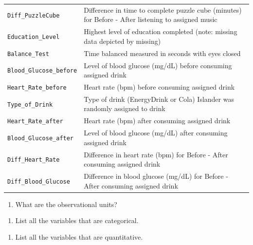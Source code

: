 \documentclass[
]{report}
\providecommand{\tightlist}{%
  \setlength{\itemsep}{0pt}\setlength{\parskip}{0pt}}
\begin{document}
\begin{longtable}[]{@{}
  >{\raggedright\arraybackslash}p{}
  >{\raggedright\arraybackslash}p{}@{}}
\texttt{Diff\_PuzzleCube} & Difference in time to complete puzzle cube (minutes) for Before - After listening to assigned music \\
\texttt{Education\_Level} & Highest level of education completed (note: missing data depicted by missing) \\
\texttt{Balance\_Test} & Time balanced measured in seconds with eyes closed \\
\texttt{Blood\_Glucose\_before} & Level of blood glucose (mg/dL) before consuming assigned drink \\
\texttt{Heart\_Rate\_before} & Heart rate (bpm) before consuming assigned drink \\
\texttt{Type\_of\_Drink} & Type of drink (EnergyDrink or Cola) Islander was randomly assigned to drink \\
\texttt{Heart\_Rate\_after} & Heart rate (bpm) after consuming assigned drink \\
\texttt{Blood\_Glucose\_after} & Level of blood glucose (mg/dL) after consuming assigned drink \\
\texttt{Diff\_Heart\_Rate} & Difference in heart rate (bpm) for Before - After consuming assigned drink \\
\texttt{Diff\_Blood\_Glucose} & Difference in blood glucose (mg/dL) for Before - After consuming assigned drink \\
\bottomrule
\end{longtable}

\begin{enumerate}
\def\labelenumi{\arabic{enumi}.}
\tightlist
\item
  What are the observational units?
\end{enumerate}

\vspace{0.3in}

\begin{enumerate}
\def\labelenumi{\arabic{enumi}.}
\setcounter{enumi}{1}
\tightlist
\item
  List all the variables that are categorical.
\end{enumerate}

\vspace{0.8in}

\begin{enumerate}
\def\labelenumi{\arabic{enumi}.}
\setcounter{enumi}{2}
\tightlist
\item
  List all the variables that are quantitative.
\end{enumerate}
\end{document}
